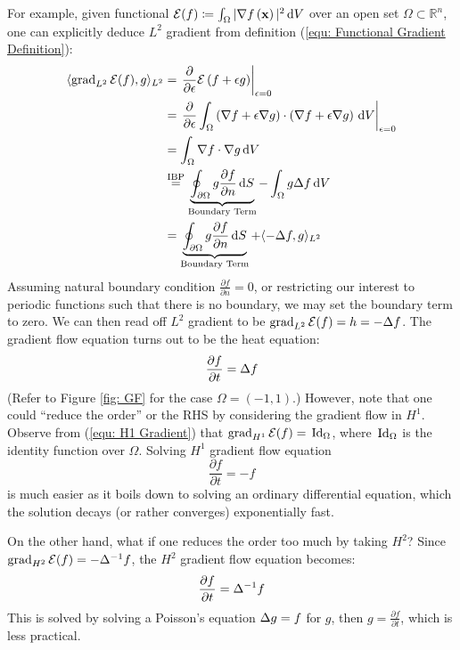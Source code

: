 \documentclass[../dissertation.tex]{subfiles}
\begin{document}
\begin{example}
    For example, given functional $\mathcal{E} (f) \coloneqq \int_{\Omega} |\nabla f \left( \mathbf{x} \right)|^2 \, \text{d} V$ over an open set $\Omega \subset \mathbb{R}^n$,
    one can explicitly deduce $L^2$ gradient from definition (\ref{equ: Functional Gradient Definition}):
    \begin{align*}
        \langle \operatorname{grad}_{L^2} \mathcal{E} (f), g \rangle_{L^2} &= \left.\frac{\partial}{\partial \epsilon} \mathcal{E} \left( f + \epsilon g \right)\right|_{\epsilon=0} \\
            &= \left.\frac{\partial}{\partial \epsilon} \int_{\Omega} \left( \nabla f + \epsilon \nabla g \right) \cdot \left( \nabla f + \epsilon \nabla g \right) \, \text{d} V\right|_{\epsilon=0} \\
                &= \int_{\Omega} \nabla f \cdot \nabla g \, \text{d} V \\
                &\stackrel{\text{IBP}}{=} \underbrace{\oint_{\partial \Omega} g \frac{\partial f}{\partial n} \, \text{d} S}_{\text{Boundary Term}} - \int_{\Omega} g \Delta f \, \text{d} V \\
                &= \underbrace{\oint_{\partial \Omega} g \frac{\partial f}{\partial n} \, \text{d} S}_{\text{Boundary Term}} + \langle -\Delta f, g \rangle_{L^2}
            \end{align*}
            Assuming natural boundary condition $\frac{\partial f}{\partial n} = 0$, or restricting our interest to periodic functions such that there is no boundary, we may set the boundary term to zero.
            We can then read off $L^2$ gradient to be $\operatorname{grad}_{L^2} \mathcal{E} (f) = h = -\Delta f$. 
            The gradient flow equation turns out to be the heat equation:
            \begin{equation}
                \frac{\partial f}{\partial t} = \Delta f
            \end{equation}
            (Refer to Figure \ref{fig: GF} for the case $\Omega = (-1, 1)$.)
            However, note that one could ``reduce the order'' or the RHS by considering the gradient flow in $H^1$.
            Observe from (\ref{equ: H1 Gradient}) that $\operatorname{grad}_{H^1} \mathcal{E} (f) = \, \text{Id}_{\Omega}$, where $\, \text{Id}_{\Omega}$ is the identity function over $\Omega$.
            Solving $H^1$ gradient flow equation
            \begin{equation}
                \frac{\partial f}{\partial t} = -f
    \end{equation}
    is much easier as it boils down to solving an ordinary differential equation,
    which the solution decays (or rather converges) exponentially fast.

    On the other hand, what if one reduces the order too much by taking $H^2$?
    Since $\operatorname{grad}_{H^2} \mathcal{E} (f) = -\Delta^{-1} f$, the $H^2$ gradient flow equation becomes:
    \begin{equation}
        \frac{\partial f}{\partial t} = \Delta^{-1} f
    \end{equation}
    This is solved by solving a Poisson's equation $\Delta g = f$ for $g$,
    then $g = \frac{\partial f}{\partial t}$,
    which is less practical.
\end{example}
\end{document}
